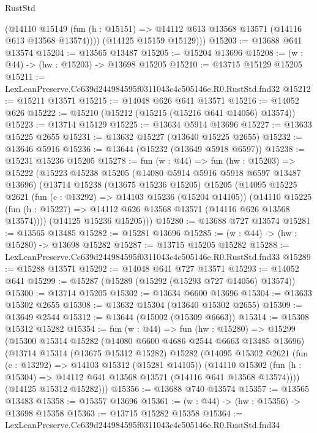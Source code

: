 \begin{lexlean}{RustStd}
\begin{coremodule}
          (@14110
            @15149
            (fun (h : @15151) => @14112 @613 @13568 @13571 (@14116 @613 @13568 @13574))))
        (@14125 @15159 @15129)))
@15203 := @13688 @641 @13574
@15204 := @13565 @13487
@15205 := @15204 @13696
@15208 := (w : @44) -> (hw : @15203) -> @13698 @15205
@15210 := @13715 @15129 @15205
@15211 := LexLeanPreserve.Cc639d244984595f0311043c4c505146e.R0.RustStd.fnd32
@15212 := @15211 @13571
@15215 := @14048 @626 @641 @13571
@15216 := @14052 @626
@15222 := @15210 (@15212 (@15215 (@15216 @641 @14056) @13574))
@15223 := @13714 @15129
@15225 := @13634 @5914 @13696
@15227 := @13633 @15225 @2655
@15231 := @13632 @15227 (@13640 @15225 @2655)
@15232 := @13646 @5916
@15236 := @13644 (@15232 (@13649 @5918 @6597))
@15238 := @15231 @15236 @15205
@15278 := fun (w : @44) =>
  fun (hw : @15203) =>
  @15222
    (@15223
      @15238
      @15205
      (@14080 @5914 @5916 @5918 @6597 @13487 @13696)
      (@13714
        @15238
        (@13675 @15236 @15205)
        @15205
        (@14095
          @15225
          @2621
          (fun (c : @13292) => @14103 @15236 (@15204 @14105))
          (@14110
            @15225
            (fun (h : @15227) => @14112 @626 @13568 @13571 (@14116 @626 @13568 @13574))))
        (@14125 @15236 @15205)))
@15280 := @13688 @727 @13574
@15281 := @13565 @13485
@15282 := @15281 @13696
@15285 := (w : @44) -> (hw : @15280) -> @13698 @15282
@15287 := @13715 @15205 @15282
@15288 := LexLeanPreserve.Cc639d244984595f0311043c4c505146e.R0.RustStd.fnd33
@15289 := @15288 @13571
@15292 := @14048 @641 @727 @13571
@15293 := @14052 @641
@15299 := @15287 (@15289 (@15292 (@15293 @727 @14056) @13574))
@15300 := @13714 @15205
@15302 := @13634 @6600 @13696
@15304 := @13633 @15302 @2655
@15308 := @13632 @15304 (@13640 @15302 @2655)
@15309 := @13649 @2544
@15312 := @13644 (@15002 (@15309 @6663))
@15314 := @15308 @15312 @15282
@15354 := fun (w : @44) =>
  fun (hw : @15280) =>
  @15299
    (@15300
      @15314
      @15282
      (@14080 @6600 @4686 @2544 @6663 @13485 @13696)
      (@13714
        @15314
        (@13675 @15312 @15282)
        @15282
        (@14095
          @15302
          @2621
          (fun (c : @13292) => @14103 @15312 (@15281 @14105))
          (@14110
            @15302
            (fun (h : @15304) => @14112 @641 @13568 @13571 (@14116 @641 @13568 @13574))))
        (@14125 @15312 @15282)))
@15356 := @13688 @740 @13574
@15357 := @13565 @13483
@15358 := @15357 @13696
@15361 := (w : @44) -> (hw : @15356) -> @13698 @15358
@15363 := @13715 @15282 @15358
@15364 := LexLeanPreserve.Cc639d244984595f0311043c4c505146e.R0.RustStd.fnd34

\end{coremodule}
\end{lexlean}
